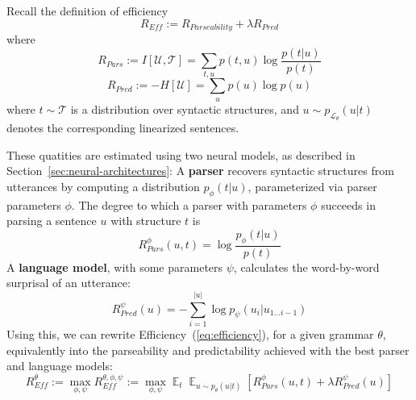 \documentclass[10pt,twoside,lineno]{article}
\DeclareMathOperator{\E}{\mathop{\mathbb{E}}}
\newcommand{\key}[1]{\textbf{#1}}
\begin{document}
Recall the definition of efficiency
\begin{equation}\label{eq:efficiency}
	R_{\textit{Eff}} := R_{\textit{Parseability}} + \lambda R_\textit{Pred}
\end{equation}
where 
\begin{equation}
	R_{Pars} := I[\mathcal{U},\mathcal{T}] = \sum_{t,u} p(t,u) \log \frac{p(t|u)}{p(t)} 
\end{equation}
\begin{equation}
	R_{Pred} := - H[\mathcal{U}] = \sum_{u} p(u) \log p(u)
\end{equation}
where $t \sim \mathcal{T}$ is a distribution over syntactic structures, and $u \sim p_{\mathcal{L}_\theta}(u|t)$ denotes the corresponding linearized sentences.

These quatities are estimated using two neural models, as described in Section~\ref{sec:neural-architectures}:
A \key{parser} recovers syntactic structures from utterances by computing a distribution $p_\phi(t|u)$, parameterized via parser parameters $\phi$.
The degree to which a parser with parameters $\phi$ succeeds in parsing a sentence $u$ with structure $t$ is
\begin{equation}
	R_{Pars}^{\phi}(u,t) =  \log \frac{p_\phi(t|u)}{p(t)}
\end{equation}
%
A \key{language model}, with some parameters $\psi$, calculates the word-by-word surprisal of an utterance:
\begin{equation}
	R_{Pred}^{\psi}(u) = - \sum_{i=1}^{|u|} \log p_\psi(u_i|u_{1\dots i-1})
\end{equation}
Using this, we can rewrite Efficiency~(\ref{eq:efficiency}), for a given grammar $\theta$, equivalently into the parseability and predictability achieved with the best parser and language models:
\begin{equation}
	R_{\textit{Eff}}^{\theta} := \max_{\phi,\psi} R_{\textit{Eff}}^{\theta, \phi, \psi} := \max_{\phi,\psi} \E_t \E_{u \sim p_\theta(u|t)} \left[R_{Pars}^{\phi}(u,t) + \lambda R_{Pred}^{\psi}(u)\right]
\end{equation}
%
\end{document}
